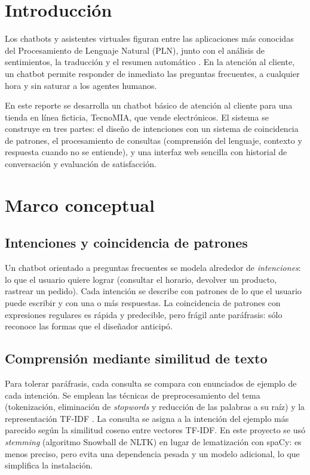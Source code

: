 \documentclass[11pt,letterpaper]{article}
\begin{document}
\portada
\indicegeneral

\section{Introducción}

Los chatbots y asistentes virtuales figuran entre las aplicaciones más conocidas del Procesamiento de Lenguaje Natural (PLN), junto con el análisis de sentimientos, la traducción y el resumen automático \parencite{iae_u4_t41, jurafsky2021}. En la atención al cliente, un chatbot permite responder de inmediato las preguntas frecuentes, a cualquier hora y sin saturar a los agentes humanos.

En este reporte se desarrolla un chatbot básico de atención al cliente para una tienda en línea ficticia, TecnoMIA, que vende electrónicos. El sistema se construye en tres partes: el diseño de intenciones con un sistema de coincidencia de patrones, el procesamiento de consultas (comprensión del lenguaje, contexto y respuesta cuando no se entiende), y una interfaz web sencilla con historial de conversación y evaluación de satisfacción.

\section{Marco conceptual}

\subsection{Intenciones y coincidencia de patrones}

Un chatbot orientado a preguntas frecuentes se modela alrededor de \textit{intenciones}: lo que el usuario quiere lograr (consultar el horario, devolver un producto, rastrear un pedido). Cada intención se describe con patrones de lo que el usuario puede escribir y con una o más respuestas. La coincidencia de patrones con expresiones regulares es rápida y predecible, pero frágil ante paráfrasis: sólo reconoce las formas que el diseñador anticipó.

\subsection{Comprensión mediante similitud de texto}

Para tolerar paráfrasis, cada consulta se compara con enunciados de ejemplo de cada intención. Se emplean las técnicas de preprocesamiento del tema (tokenización, eliminación de \textit{stopwords} y reducción de las palabras a su raíz) y la representación TF-IDF \parencite{iae_u4_t41, bird2022}. La consulta se asigna a la intención del ejemplo más parecido según la similitud coseno entre vectores TF-IDF. En este proyecto se usó \textit{stemming} (algoritmo Snowball de NLTK) en lugar de lematización con spaCy: es menos preciso, pero evita una dependencia pesada y un modelo adicional, lo que simplifica la instalación.
\end{document}
